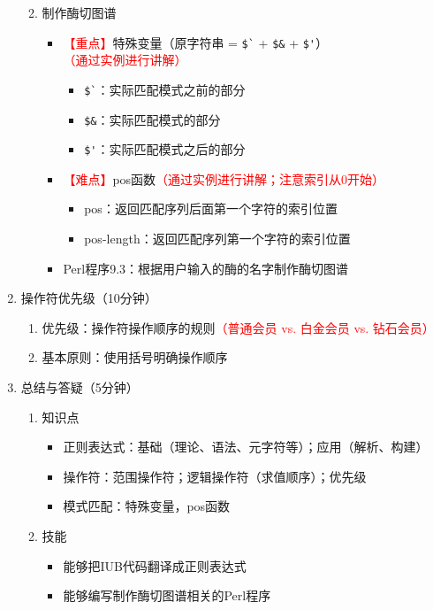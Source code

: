 \documentclass{TIJMUjiaoanLL}
\begin{document}
\begin{enumerate}
\begin{enumerate}
\begin{itemize}
\begin{itemize}
	    \end{itemize}
	\end{itemize}
      \item 制作酶切图谱
	\begin{itemize}
	  \item \textcolor{red}{【重点】}特殊变量（原字符串 = \verb|$`| + \verb|$&| + \verb|$'|）\textcolor{red}{（通过实例进行讲解）}
	    \begin{itemize}
	      \item \verb|$`|：实际匹配模式之前的部分
	      \item \verb|$&|：实际匹配模式的部分
	      \item \verb|$'|：实际匹配模式之后的部分
	    \end{itemize}
	  \item \textcolor{red}{【难点】}pos函数\textcolor{red}{（通过实例进行讲解；注意索引从0开始）}
	    \begin{itemize}
	      \item pos：返回匹配序列后面第一个字符的索引位置
	      \item pos-length：返回匹配序列第一个字符的索引位置
	    \end{itemize}
	  \item Perl程序9.3：根据用户输入的酶的名字制作酶切图谱
	\end{itemize}
    \end{enumerate}

\otherTail
\newpage
\otherHeader

  \item 操作符优先级（10分钟）
    \begin{enumerate}
      \item 优先级：操作符操作顺序的规则\textcolor{red}{（普通会员 vs. 白金会员 vs. 钻石会员）}
      \item 基本原则：使用括号明确操作顺序
    \end{enumerate}
  \item 总结与答疑（5分钟）
    \begin{enumerate}
      \item 知识点
	\begin{itemize}
	  \item 正则表达式：基础（理论、语法、元字符等）；应用（解析、构建）
	  \item 操作符：范围操作符；逻辑操作符（求值顺序）；优先级
	  \item 模式匹配：特殊变量，pos函数
	\end{itemize}
      \item 技能
	\begin{itemize}
	  \item 能够把IUB代码翻译成正则表达式
	  \item 能够编写制作酶切图谱相关的Perl程序
	\end{itemize}
    \end{enumerate}
\end{enumerate}

\otherTail
\end{document}
